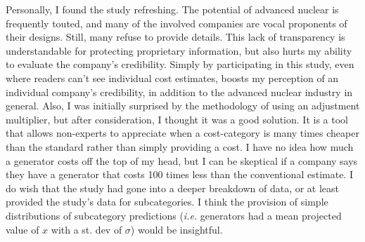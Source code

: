 \documentclass{report}
\newcommand{\tab}{\-\hspace{1cm}}
\begin{document}
\tab Personally, I found the study refreshing. The potential of advanced nuclear is frequently touted, and many of the involved companies are vocal proponents of their designs. Still, many refuse to provide details. This lack of transparency is understandable for protecting proprietary information, but also hurts my ability to evaluate the company's credibility. Simply by participating in this study, even where readers can't see individual cost estimates, boosts my perception of an individual company's credibility, in addition to the advanced nuclear industry in general. Also, I was initially surprised by the methodology of using an adjustment multiplier, but after consideration, I thought it was a good solution. It is a tool that allows non-experts to appreciate when a cost-category is many times cheaper than the standard rather than simply providing a cost. I have no idea how much a generator costs off the top of my head, but I can be skeptical if a company says they have a generator that costs 100 times less than the conventional estimate. I do wish that the study had gone into a deeper breakdown of data, or at least provided the study's data for subcategories. I think the provision of simple distributions of subcategory predictions (\textit{i.e.} generators had a mean projected value of $x$ with a st. dev of $\sigma$) would be insightful.\\
\end{document}
